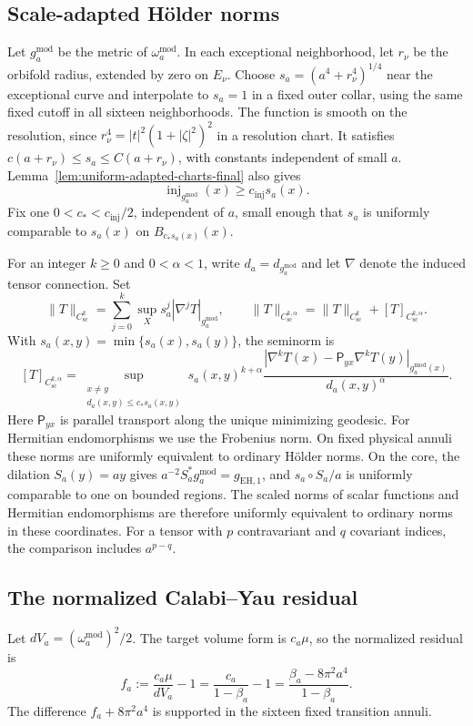 \documentclass[11pt,a4paper,twoside]{article}
\numberwithin{equation}{section}
\theoremstyle{definition}
\theoremstyle{remark}
\begin{document}
\subsection{Scale-adapted H\"older norms}
\label{subsec:scale-adapted-norms}
Let \(g_a^{\mathrm{mod}}\) be the metric of
\(\omega_a^{\mathrm{mod}}\). In each exceptional neighborhood,
let \(r_\nu\) be the orbifold radius, extended by zero on
\(E_\nu\). Choose \(s_a=(a^4+r_\nu^4)^{1/4}\) near the
exceptional curve and interpolate to \(s_a=1\) in a fixed outer
collar, using the same fixed cutoff in all sixteen neighborhoods.
The function is smooth on the resolution, since
\(r_\nu^4=|t|^2(1+|\zeta|^2)^2\) in a resolution chart.
It satisfies \(c(a+r_\nu)\le s_a\le C(a+r_\nu)\), with
constants independent of small \(a\).
Lemma~\ref{lem:uniform-adapted-charts-final} also gives
\begin{equation}\label{eq:uniform-scaled-injectivity}
\operatorname{inj}_{g_a^{\mathrm{mod}}}(x)
\ge c_{\mathrm{inj}}s_a(x).
\end{equation}
Fix one \(0<c_*<c_{\mathrm{inj}}/2\), independent of \(a\),
small enough that \(s_a\) is uniformly comparable to \(s_a(x)\)
on \(B_{c_*s_a(x)}(x)\).

For an integer \(k\ge0\) and \(0<\alpha<1\), write
\(d_a=d_{g_a^{\mathrm{mod}}}\) and let \(\nabla\) denote the
induced tensor connection. Set
\[
\|T\|_{C_{\mathrm{sc}}^k}
=\sum_{j=0}^k\sup_Xs_a^j|\nabla^jT|_{g_a^{\mathrm{mod}}},
\qquad \|T\|_{C_{\mathrm{sc}}^{k,\alpha}}
=\|T\|_{C_{\mathrm{sc}}^k}+[T]_{C_{\mathrm{sc}}^{k,\alpha}}.
\]
With \(s_a(x,y)=\min\{s_a(x),s_a(y)\}\), the seminorm is
\[
[T]_{C_{\mathrm{sc}}^{k,\alpha}}
=\sup_{\substack{x\ne y\\d_a(x,y)\le c_*s_a(x,y)}}
s_a(x,y)^{k+\alpha}
\frac{|\nabla^kT(x)-\mathsf P_{yx}\nabla^kT(y)|
_{g_a^{\mathrm{mod}}(x)}}{d_a(x,y)^\alpha}.
\]
Here \(\mathsf P_{yx}\) is parallel transport along the unique
minimizing geodesic. For Hermitian endomorphisms we use the
Frobenius norm. On fixed physical annuli these norms are uniformly
equivalent to ordinary H\"older norms. On the core, the dilation
\(S_a(y)=ay\) gives
\(a^{-2}S_a^*g_a^{\mathrm{mod}}=g_{\mathrm{EH},1}\), and
\(s_a\circ S_a/a\) is uniformly comparable to one on bounded
regions. The scaled norms of scalar functions and Hermitian
endomorphisms are therefore uniformly equivalent to ordinary norms
in these coordinates. For a tensor with \(p\) contravariant and
\(q\) covariant indices, the comparison includes \(a^{p-q}\).

\subsection{The normalized Calabi--Yau residual}
\label{subsec:model-residual}
Let \(dV_a=(\omega_a^{\mathrm{mod}})^2/2\). The target volume
form is \(c_a\mu\), so the normalized residual is
\begin{equation}\label{eq:fa-explicit}
f_a:=\frac{c_a\mu}{dV_a}-1
=\frac{c_a}{1-\beta_a}-1
=\frac{\beta_a-8\pi^2a^4}{1-\beta_a}.
\end{equation}
The difference \(f_a+8\pi^2a^4\) is supported in the sixteen fixed transition annuli.
\end{document}
